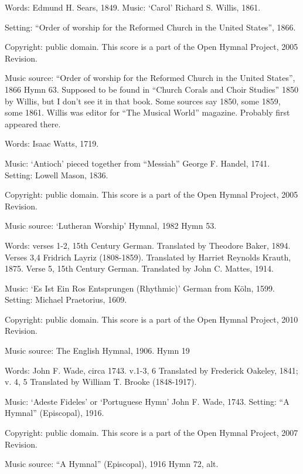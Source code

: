 \begin{multicols}{2}
\par\noindent
Words: Edmund H. Sears, 1849.  Music: `Carol' Richard S. Willis, 1861.  
\par\noindent
Setting: ``Order of worship for the Reformed Church in the United States'', 1866.
\par\noindent
Copyright: public domain. This score is a part of the Open Hymnal Project, 2005 Revision.
\par\noindent
Music source: ``Order of worship for the Reformed Church in the United States'', 1866 Hymn 63. Supposed to be found in ``Church Corals and Choir Studies'' 1850 by Willis, but I don't see it in that book. Some sources say 1850, some 1859, some 1861.  Willis was editor for ``The Musical World'' magazine.  Probably first appeared there.

\par\noindent
Words: Isaac Watts, 1719.
\par\noindent
Music: `Antioch' pieced together from ``Messiah'' George F. Handel, 1741.  Setting: Lowell Mason, 1836.
\par\noindent
Copyright: public domain. This score is a part of the Open Hymnal Project, 2005 Revision.
\par\noindent
Music source: `Lutheran Worship' Hymnal, 1982 Hymn 53.

\par\noindent
Words: verses 1-2, 15th Century German.  Translated by Theodore Baker, 1894. Verses 3,4 Fridrich Layriz (1808-1859).  Translated by Harriet Reynolds Krauth, 1875. Verse 5, 15th Century German.  Translated by John C. Mattes, 1914.
\par\noindent
Music: `Es Ist Ein Ros Entsprungen (Rhythmic)' German from Köln, 1599.  Setting: Michael Praetorius, 1609.
\par\noindent
Copyright: public domain. This score is a part of the Open Hymnal Project, 2010 Revision.
\par\noindent
Music source: The English Hymnal, 1906.  Hymn 19

\par\noindent
Words:  John F. Wade, circa 1743. v.1-3, 6 Translated by Frederick Oakeley, 1841; v. 4, 5 Translated by William T. Brooke (1848-1917). 
\par\noindent
Music: `Adeste Fideles' or `Portuguese Hymn' John F. Wade, 1743.  Setting: ``A Hymnal'' (Episcopal), 1916.
\par\noindent
Copyright: public domain. This score is a part of the Open Hymnal Project, 2007 Revision.
\par\noindent
Music source: ``A Hymnal'' (Episcopal), 1916 Hymn 72, alt.


\end{multicols}
